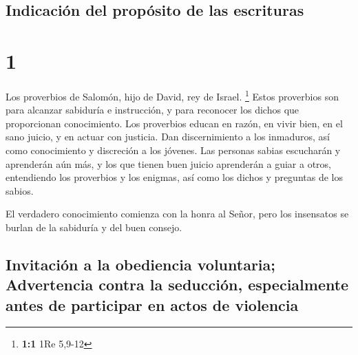 \hypertarget{indicaciuxf3n-del-propuxf3sito-de-las-escrituras}{%
\subsection{Indicación del propósito de las
escrituras}\label{indicaciuxf3n-del-propuxf3sito-de-las-escrituras}}

\hypertarget{section}{%
\section{1}\label{section}}

 Los proverbios de Salomón, hijo de David, rey de Israel.
\footnote{\textbf{1:1} 1Re 5,9-12}  Estos proverbios son
para alcanzar sabiduría e instrucción, y para reconocer los dichos que
proporcionan conocimiento.  Los proverbios educan en razón,
en vivir bien, en el sano juicio, y en actuar con justicia. 
Dan discernimiento a los inmaduros, así como conocimiento y discreción a
los jóvenes.  Las personas sabias escucharán y aprenderán
aún más, y los que tienen buen juicio aprenderán a guiar a otros,
 entendiendo los proverbios y los enigmas, así como los
dichos y preguntas de los sabios.

 El verdadero conocimiento comienza con la honra al Señor,
pero los insensatos se burlan de la sabiduría y del buen consejo.

\hypertarget{invitaciuxf3n-a-la-obediencia-voluntaria-advertencia-contra-la-seducciuxf3n-especialmente-antes-de-participar-en-actos-de-violencia}{%
\subsection{Invitación a la obediencia voluntaria; Advertencia contra la
seducción, especialmente antes de participar en actos de
violencia}\label{invitaciuxf3n-a-la-obediencia-voluntaria-advertencia-contra-la-seducciuxf3n-especialmente-antes-de-participar-en-actos-de-violencia}}

